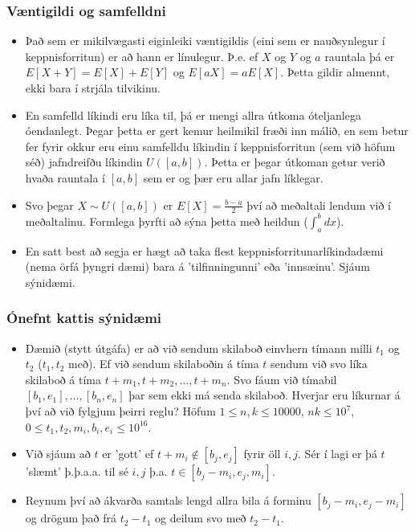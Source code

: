 \documentclass{beamer}
\begin{document}
\begin{frame}
\frametitle{Væntigildi og samfelldni}

\begin{itemize}

\item<1-> Það sem er mikilvægasti eiginleiki væntigildis (eini sem er nauðsynlegur í keppnisforritun) er að hann er línulegur. Þ.e. ef $X$ og $Y$ og $a$ rauntala þá er $E[X + Y] = E[X] + E[Y]$ og $E[aX] = aE[X]$. Þetta gildir almennt, ekki bara í strjála tilvikinu. 

\item<2-> En samfelld líkindi eru líka til, þá er mengi allra útkoma óteljanlega óendanlegt. Þegar þetta er gert kemur heilmikil fræði inn málið, en sem betur fer fyrir okkur eru einu samfelldu líkindin í keppnisforritun (sem við höfum séð) jafndreifðu líkindin $U([a, b])$. Þetta er þegar útkoman getur verið hvaða rauntala í $[a, b]$ sem er og þær eru allar jafn líklegar.

\item<3-> Svo þegar $X \sim U([a, b])$ er $E[X] = \frac{b - a}{2}$ því að meðaltali lendum við í meðaltalinu. Formlega þyrfti að sýna þetta með heildun ($\int_a^b dx$).

\item<4-> En satt best að segja er hægt að taka flest keppnisforritunarlíkindadæmi (nema örfá þyngri dæmi) bara á 'tilfinningunni' eða 'innsæinu'. Sjáum sýnidæmi.

\end{itemize}

\end{frame}

\begin{frame}
\frametitle{Ónefnt kattis sýnidæmi}

\begin{itemize}

\item<1-> Dæmið (stytt útgáfa) er að við sendum skilaboð einvhern tímann milli $t_1$ og $t_2$ ($t_1, t_2$ með). Ef við sendum skilaboðin á tíma $t$ sendum við svo líka skilaboð á tíma $t + m_1, t + m_2, \dots, t + m_n$. Svo fáum við tímabil $[b_1, e_1], \dots, [b_n, e_n]$ þar sem ekki má senda skilaboð. Hverjar eru líkurnar á því að við fylgjum þeirri reglu? Höfum $1 \leq n, k \leq 10000$, $nk \leq 10^7$, $0 \leq t_1,t_2,m_i,b_i,e_i \leq 10^{16}$.

\item<2-> Við sjáum að $t$ er 'gott' ef $t + m_i \notin [b_j, e_j]$ fyrir öll $i, j$. Sér í lagi er þá $t$ 'slæmt' þ.þ.a.a. til sé $i, j$ þ.a. $t \in [b_j - m_i, e_j, m_i]$.

\item<3-> Reynum því að ákvarða samtals lengd allra bila á forminu $[b_j - m_i, e_j - m_i]$ og drögum það frá $t_2 - t_1$ og deilum svo með $t_2 - t_1$.

\end{itemize}

\end{frame}
\end{document}
